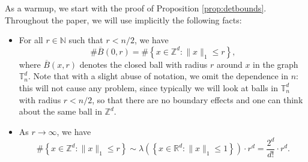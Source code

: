 \documentclass[a4paper,11pt]{article}
\begin{document}
As a warmup, we start with the proof of Proposition \ref{prop:detbounds}.
Throughout the paper, we will use implicitly the following facts:
\begin{itemize}
\item For all $r\in\mathbb{N}$ such that $r<n/2$, we have
\[\#\overline{B}(0,r)=\#\left\{x\in\mathbb{Z}^d:\|x\|_1\leq r\right\},\]
where $\overline{B}(x,r)$ denotes the closed ball with radius $r$ around $x$ in the graph $\mathbb{T}_n^d$.
Note that with a slight abuse of notation, we omit the dependence in $n$: this will not cause any problem, since typically we will look at balls in $\mathbb{T}_n^d$ with radius $r<n/2$, so that there are no boundary effects and one can think about the same ball in $\mathbb{Z}^d$.

\item As $r\to\infty$, we have
\[\#\left\{x\in\mathbb{Z}^d:\|x\|_1\leq r\right\}\sim\lambda\left(\left\{x\in\mathbb{R}^d:\|x\|_1\leq1\right\}\right)\cdot r^d=\frac{2^d}{d!}\cdot r^d.\]
\end{itemize}
\end{document}
